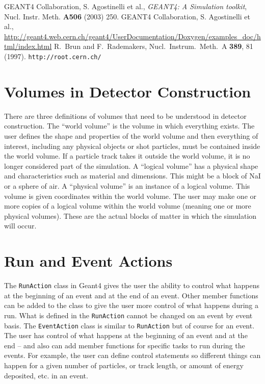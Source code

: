 \documentclass[aps,prd,twocolumn,nofootinbib]{revtex4-1}
\begin{document}
\begin{thebibliography}{9}
  GEANT4 Collaboration, S. Agostinelli et al., \textit{GEANT4: A Simulation toolkit}, Nucl. Instr. Meth. \textbf{A506} (2003) 250.
  GEANT4 Collaboration, S. Agostinelli et al., \url{http://geant4.web.cern.ch/geant4/UserDocumentation/Doxygen/examples_doc/html/index.html}
  R.~Brun and F.~Rademakers, Nucl.\ Instrum.\ Meth.\ A {\bf 389}, 81 (1997). \texttt{http://root.cern.ch/}
\end{thebibliography}

\begin{appendix}

\section{Volumes in Detector Construction}\label{sec:AppendixA}
There are three definitions of volumes that need to be understood in detector construction. The ``world volume'' is the volume in which everything exists. The user defines the shape and properties of the world volume and then everything of interest, including any physical objects or shot particles, must be contained inside the world volume. If a particle track takes it outside the world volume, it is no longer considered part of the simulation. A ``logical volume'' has a physical shape and characteristics such as material and dimensions. This might be a block of NaI or a sphere of air. A ``physical volume'' is an instance of a logical volume. This volume is given coordinates within the world volume. The user may make one or more copies of a logical volume within the world volume (meaning one or more physical volumes). These are the actual blocks of matter in which the simulation will occur.
\section{Run and Event Actions}\label{sec:AppendixB}
The \texttt{RunAction} class in Geant4 gives the user the ability to control what happens at the beginning of an event and at the end of an event. Other member functions can be added to the class to give the user more control of what happens during a run. What is defined in the \texttt{RunAction} cannot be changed on an event by event basis. The \texttt{EventAction} class is similar to \texttt{RunAction} but of course for an event. The user has control of what happens at the beginning of an event and at the end -- and also can add member functions for specific tasks to run during the events. For example, the user can define control statements so different things can happen for a given number of particles, or track length, or amount of energy deposited, etc. in an event.

\end{appendix}
\end{document}
